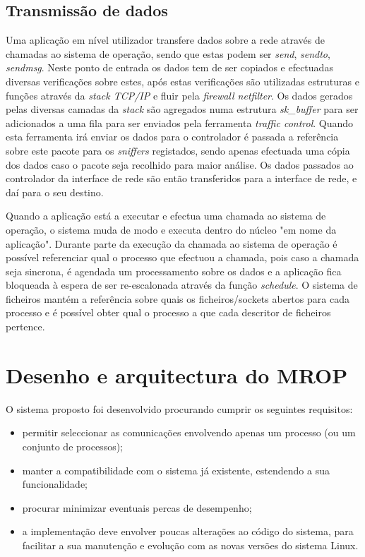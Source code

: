 \subsection{Transmissão de dados}

Uma aplicação em nível utilizador transfere dados sobre a rede através de chamadas ao sistema de operação, sendo que estas podem ser \textit{send}, \textit{sendto}, \textit{sendmsg}.
 Neste ponto de entrada os dados tem de ser copiados e efectuadas diversas verificações sobre estes, após estas verificações são utilizadas estruturas e funções através da \textit{stack TCP/IP} e fluir pela \textit{firewall netfilter}.
 Os dados gerados pelas diversas camadas da \textit{stack} são agregados numa estrutura \textit{sk\_buffer} para ser adicionados a uma fila para ser enviados pela ferramenta \textit{traffic control}.
 Quando esta ferramenta irá enviar os dados para o controlador é passada a referência sobre este pacote para os \textit{sniffers} registados, sendo apenas efectuada uma cópia dos dados caso o pacote seja recolhido para maior análise. Os dados passados ao controlador da interface de rede são então transferidos para a interface de rede, e daí para o seu destino.

Quando a aplicação está a executar e efectua uma chamada ao sistema de operação, o sistema muda de modo e executa dentro do núcleo "em nome da aplicação".
 Durante parte da execução da chamada ao sistema de operação é possível referenciar qual o processo que efectuou a chamada, pois caso a chamada seja sincrona, é agendada um processamento sobre os dados e a aplicação fica bloqueada à espera de ser re-escalonada através da função \textit{schedule}.
 O sistema de ficheiros mantém a referência sobre quais os ficheiros/sockets abertos para cada processo e é possível obter qual o processo a que cada descritor de ficheiros pertence. %

\section{Desenho e arquitectura do MROP}
\label{sec:architecture}

O sistema proposto foi desenvolvido procurando cumprir os seguintes requisitos:
\begin{itemize}
\item permitir seleccionar as comunicações envolvendo apenas um processo (ou um conjunto de processos);
\item manter a compatibilidade com o sistema já existente, estendendo a sua funcionalidade;
\item procurar minimizar eventuais percas de desempenho;
\item a implementação deve envolver poucas alterações ao código do sistema, para facilitar a sua manutenção e evolução com as novas versões do sistema Linux.
\end{itemize}

